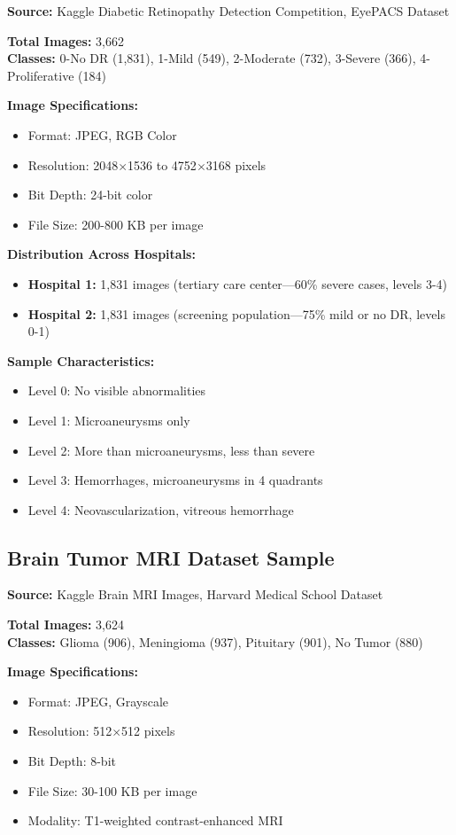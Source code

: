 \textbf{Source:} Kaggle Diabetic Retinopathy Detection Competition, EyePACS Dataset

\textbf{Total Images:} 3,662 \\
\textbf{Classes:} 0-No DR (1,831), 1-Mild (549), 2-Moderate (732), 3-Severe (366), 4-Proliferative (184)

\textbf{Image Specifications:}
\begin{itemize}
    \item Format: JPEG, RGB Color
    \item Resolution: 2048$\times$1536 to 4752$\times$3168 pixels
    \item Bit Depth: 24-bit color
    \item File Size: 200-800 KB per image
\end{itemize}

\textbf{Distribution Across Hospitals:}
\begin{itemize}
    \item \textbf{Hospital 1:} 1,831 images (tertiary care center—60\% severe cases, levels 3-4)
    \item \textbf{Hospital 2:} 1,831 images (screening population—75\% mild or no DR, levels 0-1)
\end{itemize}

\textbf{Sample Characteristics:}
\begin{itemize}
    \item Level 0: No visible abnormalities
    \item Level 1: Microaneurysms only
    \item Level 2: More than microaneurysms, less than severe
    \item Level 3: Hemorrhages, microaneurysms in 4 quadrants
    \item Level 4: Neovascularization, vitreous hemorrhage
\end{itemize}

\subsection{Brain Tumor MRI Dataset Sample}

\textbf{Source:} Kaggle Brain MRI Images, Harvard Medical School Dataset

\textbf{Total Images:} 3,624 \\
\textbf{Classes:} Glioma (906), Meningioma (937), Pituitary (901), No Tumor (880)

\textbf{Image Specifications:}
\begin{itemize}
    \item Format: JPEG, Grayscale
    \item Resolution: 512$\times$512 pixels
    \item Bit Depth: 8-bit
    \item File Size: 30-100 KB per image
    \item Modality: T1-weighted contrast-enhanced MRI
\end{itemize}

